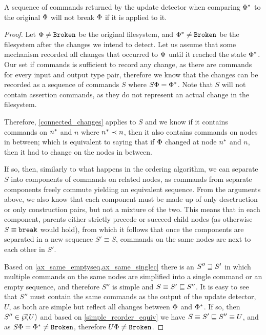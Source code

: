\documentclass[12pt]{article}
\begin{document}
\begin{myth}\label{update_works}
A sequence of commands returned by the update detector
when comparing $\Phi^*$ to the original $\Phi$
will not break $\Phi$ if it is applied to it.
\end{myth}
\begin{proof}
Let $\Phi\neq\mathtt{Broken}$ be the original filesystem, and $\Phi^*\neq\mathtt{Broken}$
be the filesystem after the changes we intend to detect.
Let us assume that some mechanism recorded all changes that occurred
to $\Phi$ until it reached the state $\Phi^*$.
Our set if commands is sufficient to record any change, as
there are commands for every input and output type pair, therefore
we know that the changes can be recorded as a sequence of commands $S$
where $S\Phi=\Phi^*$.
Note that $S$ will not contain assertion commands, as they do not
represent an actual change in the filesystem.

Therefore, \cref{connected_changes} applies to $S$ and we know
if it contains commands on $n^*$ and $n$ where $n^*\prec n$,
then it also contains commands on nodes in between;
which is equivalent to saying that if $\Phi$ changed
at node $n^*$ and $n$, then it had to change on the nodes in between.

If so, then, similarly to what happens in the ordering algorithm,
we can separate $S$ into components of commands on related nodes,
as commands from separate components freely commute yielding an equivalent sequence.
From the arguments above, we also know that each component
must be made up of only desctruction or only construction pairs,
but not a mixture of the two.
This means that in each component, parents either strictly precede or succeed child nodes
(as otherwise $S\equiv\mathtt{break}$ would hold),
from which it follows that once the components are separated
in a new sequence $S'\equiv S$,
commands on the same nodes are next to each other in $S'$.

Based on \cref{ax_same_emptyseq,ax_same_singlec} there is
an $S''\sqsupseteq S'$ in which multiple commands on the same nodes
are simplified into a single command or an empty sequence,
and therefore $S''$ is simple and $S\equiv S'\sqsubseteq S''$.
It is easy to see that $S''$ must contain the same commands
as the output of the update detector, $U$, as both are simple
but reflect all changes between $\Phi$ and $\Phi^*$.
If so, then $S''\in\vec{\wp}({U})$ and based on \cref{simple_reorder_equiv}
we have
$S\equiv S'\sqsubseteq S''\equiv U$, and as $S\Phi = \Phi^* \neq \mathtt{Broken}$,
therefore $U\Phi\neq\mathtt{Broken}$.
\end{proof}
\end{document}
